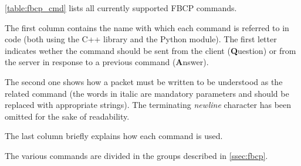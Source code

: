 \autoref{table:fbcp_cmd} lists all currently supported FBCP commands.

The first column contains the name with which each command is referred
to in code (both using the C++ library and the Python module).
The first letter indicates wether the command should be sent from the
client (\textbf{Q}uestion) or from the server in response to a previous
command (\textbf{A}nswer).

The second one shows how a packet must be written to be understood as
the related command (the words in italic are mandatory parameters and
should be replaced with appropriate strings). The terminating
\textit{newline} character has been omitted for the sake of readability.

The last column briefly explains how each command is used.

The various commands are divided in the groups described in
\autoref{ssec:fbcp}.


